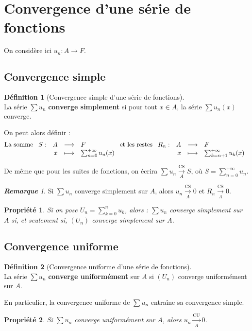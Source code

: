 \documentclass[12pt]{book}
\newcommand{\app}[5]{\ensuremath{
\begin{array}[t]{lrcl}
#1 : & #2 & \longrightarrow & #3 \\
    & #4 & \longmapsto & #5 \end{array}
}}
\newcommand{\ls}[1]{\ensuremath{\overset{\mathrm{CS}}{\underset{#1}{\longrightarrow}}}}
\newcommand{\lu}[1]{\ensuremath{\overset{\mathrm{CU}}{\underset{#1}{\longrightarrow}}}}
\newtheorem*{prop}{Propriété}
\theoremstyle{definition}
\newtheorem*{defi}{Définition}
\theoremstyle{remark}
\newtheorem*{rem}{\textbf{Remarque}}
\newenvironment{fdef}
  {\begin{mdframed}[roundcorner=10pt, linewidth=1pt]\begin{defi}}
  {\end{defi}\end{mdframed}}
\begin{document}
	\section{Convergence d'une série de fonctions}
	On considère ici $u_n : A \longrightarrow F$.
		\subsection{Convergence simple}
	\begin{fdef}[Convergence simple d'une série de fonctions]\mbox{~}\\
	La série $\sum u_n$ \textbf{converge simplement} si pour tout $x \in A$, la série $\sum u_n(x)$ converge.
	
	\noindent On peut alors définir :
	\[ \text{La somme } \app{S}{A}{F}{x}{\sum_{n=0}^{+\infty} u_n(x)} \text{ et les restes }  \app{R_n}{A}{F}{x}{\sum_{k=n+1}^{+\infty} u_k(x)} \]
	\end{fdef}
	
	De même que pour les suites de fonctions, on écrira $\sum u_n \ls A S$, où $S = \sum_{n=0}^{+\infty} u_n$.
	
	\begin{rem}
	Si $\sum u_n$ converge simplement sur $A$, alors $u_n \ls A 0$ et $R_n \ls A 0$.
	\end{rem}
	
	\begin{prop}
	Si on pose $U_n = \sum_{k=0}^n u_k$, alors : $\sum u_n$ converge simplement sur $A$ si, et seulement si, $(U_n)$ converge simplement sur $A$.
	\end{prop}
	
	\subsection{Convergence uniforme}
	\begin{fdef}[Convergence uniforme d'une série de fonctions]\mbox{~}\\
	La série $\sum u_n$ \textbf{converge uniformément} sur $A$ si $(U_n)$ converge uniformément sur $A$.
	
	\noindent En particulier, la convergence uniforme de $\sum u_n$ entraîne sa convergence simple.
	\end{fdef}
	
	\begin{prop}
	Si $\sum u_n$ converge uniformément sur $A$, alors $u_n \lu A 0$.
	\end{prop}
	
\end{document}
